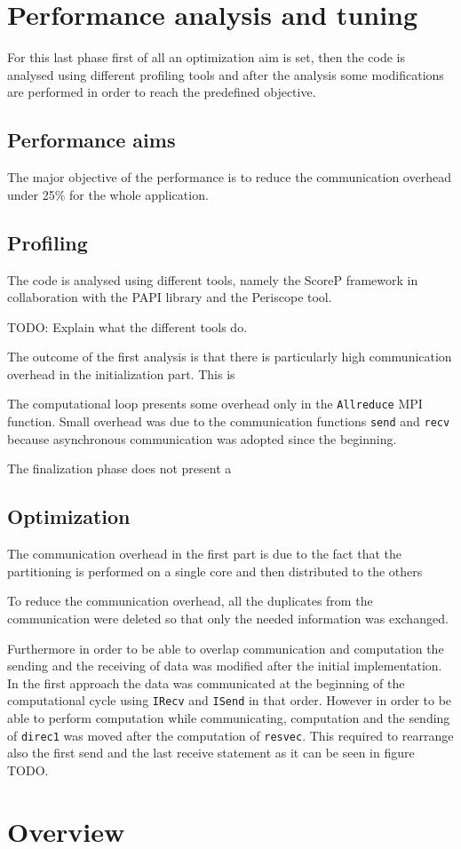 \documentclass[12pt, a4paper]{article}
\begin{document}
\clearpage

\section{Performance analysis and tuning}
For this last phase first of all an optimization aim is set, then the code is
analysed using different profiling tools and after the analysis some
modifications are performed in order to reach the predefined objective.

\subsection*{Performance aims}
The major objective of the performance is to reduce the communication overhead
under 25\% for the whole application. 

\subsection*{Profiling}
The code is analysed using different tools, namely the ScoreP framework in 
collaboration with the PAPI library and the Periscope tool.

TODO: Explain what the different tools do.

The outcome of the first analysis is that there is particularly high
communication overhead in the initialization part. This is 

The computational loop presents some overhead only in the \verb=Allreduce= MPI
function. Small overhead was due to the communication functions \verb=send= and
\verb=recv= because asynchronous communication was adopted since the beginning.

The finalization phase does not present a

\subsection*{Optimization}
The communication overhead in the first part is due to the fact that the
partitioning is performed on a single core and then distributed to the others

To reduce the communication overhead, all the duplicates from the communication
were deleted so that only the needed information was exchanged.

Furthermore in order to be able to overlap communication and computation the
sending and the receiving of data was modified after the initial implementation.
In the first approach the data was communicated at the beginning of the
computational cycle using \verb=IRecv= and \verb=ISend= in that order. However
in order to be able to perform computation while communicating, computation and
the sending of \verb=direc1= was moved after the computation of \verb=resvec=.
This required to rearrange also the first send and the last receive statement as
it can be seen in figure TODO.

\section{Overview}
\end{document}
